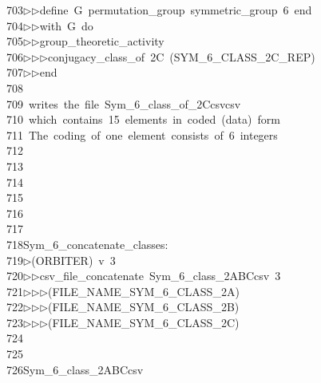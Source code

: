 \begin{tabbing}
703\>$\triangleright$\>$\triangleright$\>define\ G\ permutation\_group\ symmetric\_group\ 6\ end\ \\[0pt]
704\>$\triangleright$\>$\triangleright$\>with\ G\ do\ \\[0pt]
705\>$\triangleright$\>$\triangleright$\>group\_theoretic\_activity\ \\[0pt]
706\>$\triangleright$\>$\triangleright$\>$\triangleright$\>conjugacy\_class\_of\ 2C\ (SYM\_6\_CLASS\_2C\_REP)\ \\[0pt]
707\>$\triangleright$\>$\triangleright$\>end\\[0pt]
708\>\\[0pt]
709\>\ writes\ the\ file\ Sym\_6\_class\_of\_2Ccsvcsv\\[0pt]
710\>\ which\ contains\ 15\ elements\ in\ coded\ (data)\ form\\[0pt]
711\>\ The\ coding\ of\ one\ element\ consists\ of\ 6\ integers\\[0pt]
712\>\\[0pt]
713\>\\[0pt]
714\>\\[0pt]
715\>\\[0pt]
716\>\\[0pt]
717\>\\[0pt]
718\>Sym\_6\_concatenate\_classes:\\[0pt]
719\>$\triangleright$\>(ORBITER)\ v\ 3\ \\[0pt]
720\>$\triangleright$\>$\triangleright$\>csv\_file\_concatenate\ Sym\_6\_class\_2ABCcsv\ 3\ \\[0pt]
721\>$\triangleright$\>$\triangleright$\>$\triangleright$\>(FILE\_NAME\_SYM\_6\_CLASS\_2A)\ \\[0pt]
722\>$\triangleright$\>$\triangleright$\>$\triangleright$\>(FILE\_NAME\_SYM\_6\_CLASS\_2B)\ \\[0pt]
723\>$\triangleright$\>$\triangleright$\>$\triangleright$\>(FILE\_NAME\_SYM\_6\_CLASS\_2C)\\[0pt]
724\>\\[0pt]
725\>\\[0pt]
726\>Sym\_6\_class\_2ABCcsv\\[0pt]

\end{tabbing}
